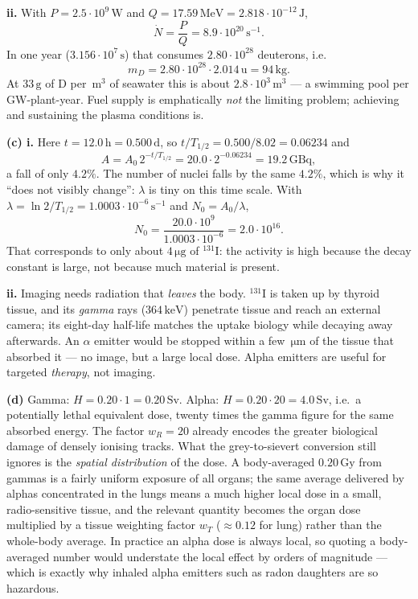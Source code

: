 \documentclass[11pt,a4paper]{article}
\newcommand{\unit}[1]{\,\mathrm{#1}}
\begin{document}
\textbf{ii.} With $P=2.5\cdot10^{9}\unit{W}$ and
$Q=17.59\unit{MeV}=2.818\cdot10^{-12}\unit{J}$,
\[
  \dot N=\frac{P}{Q}=\boxed{8.9\cdot10^{20}\unit{s^{-1}}} .
\]
In one year ($3.156\cdot10^{7}\unit{s}$) that consumes
$2.80\cdot10^{28}$ deuterons, i.e.\
\[
  m_D=2.80\cdot10^{28}\cdot2.014\unit{u}=\boxed{94\unit{kg}} .
\]
At $33\unit{g}$ of D per $\unit{m^3}$ of seawater this is about
$2.8\cdot10^{3}\unit{m^3}$ --- a swimming pool per GW-plant-year. Fuel
supply is emphatically \emph{not} the limiting problem; achieving and
sustaining the plasma conditions is.

\textbf{(c) i.} Here $t=12.0\unit{h}=0.500\unit{d}$, so
$t/T_{1/2}=0.500/8.02=0.06234$ and
\[
  A=A_0\,2^{-t/T_{1/2}}=20.0\cdot2^{-0.06234}
  =\boxed{19.2\unit{GBq}},
\]
a fall of only $4.2\%$. The number of nuclei falls by the same $4.2\%$,
which is why it ``does not visibly change'': $\lambda$ is tiny on this time
scale. With $\lambda=\ln2/T_{1/2}=1.0003\cdot10^{-6}\unit{s^{-1}}$ and
$N_0=A_0/\lambda$,
\[
  N_0=\frac{20.0\cdot10^{9}}{1.0003\cdot10^{-6}}
  =\boxed{2.0\cdot10^{16}} .
\]
That corresponds to only about $4\unit{\mu g}$ of ${}^{131}\mathrm{I}$:
the activity is high because the decay constant is large, not because much
material is present.

\textbf{ii.} Imaging needs radiation that \emph{leaves} the body.
${}^{131}\mathrm{I}$ is taken up by thyroid tissue, and its \emph{gamma}
rays ($364\unit{keV}$) penetrate tissue and reach an external camera; its
eight-day half-life matches the uptake biology while decaying away
afterwards. An $\alpha$ emitter would be stopped within a few
$\unit{\mu m}$ of the tissue that absorbed it --- no image, but a large
local dose. Alpha emitters are useful for targeted \emph{therapy}, not
imaging.

\textbf{(d)} Gamma: $H=0.20\cdot1=\boxed{0.20\unit{Sv}}$. Alpha:
$H=0.20\cdot20=\boxed{4.0\unit{Sv}}$, i.e.\ a potentially lethal equivalent
dose, twenty times the gamma figure for the same absorbed energy. The
factor $w_R=20$ already encodes the greater biological damage of densely
ionising tracks. What the grey-to-sievert conversion still ignores is the
\emph{spatial distribution} of the dose. A body-averaged $0.20\unit{Gy}$
from gammas is a fairly uniform exposure of all organs; the same average
delivered by alphas concentrated in the lungs means a much higher local
dose in a small, radio-sensitive tissue, and the relevant quantity becomes
the organ dose multiplied by a tissue weighting factor $w_T$ ($\approx
0.12$ for lung) rather than the whole-body average. In practice an alpha
dose is always local, so quoting a body-averaged number would understate
the local effect by orders of magnitude --- which is exactly why inhaled
alpha emitters such as radon daughters are so hazardous.
\end{document}
